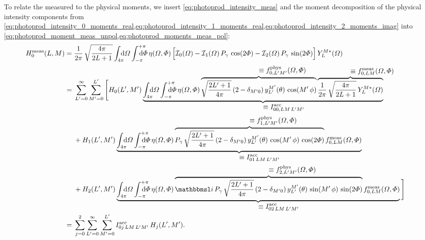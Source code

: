 To relate the measured to the physical moments, we insert
\cref{eq:photoprod_intensity_meas} and the moment decomposition of the
physical intensity components from
\cref{eq:photoprod_intensity_0_moments_real,eq:photoprod_intensity_1_moments_real,eq:photoprod_intensity_2_moments_imag}
into
\cref{eq:photoprod_moment_meas_unpol,eq:photoprod_moments_meas_pol}:
\begin{align}
  H_0^\text{meas}(L, M)
  ={}& \frac{1}{2 \pi}\, \sqrt{\frac{4 \pi}{2 L + 1}} \int_{4 \pi}\!\!\!\! \dif{\Omega} \int_{-\pi}^{+\pi}\hspace{-1.2em} \dif{\Phi}\,
  \eta(\Omega, \Phi) \sBrk[2]{\intensity_0(\Omega)
  - \intensity_1(\Omega)\, P_\gamma\, \cos(2 \Phi)
  - \intensity_2(\Omega)\, P_\gamma\, \sin(2 \Phi)}
  Y_L^{M *}(\Omega) \nonumber
  \\
  ={}& \sum_{L' = 0}^\infty \sum_{M' = 0}^{L'} \Bigg[
  H_0(L', M')\,
  \rdUnderbrace{\int_{4 \pi}\!\!\!\! \dif{\Omega} \int_{-\pi}^{+\pi}\hspace{-1.2em} \dif{\Phi}\,
  \eta(\Omega, \Phi)\,
  \rdOverbrace{\sqrt{\frac{2 L' + 1}{4 \pi}}\, (2 - \delta_{M' 0})\, y_{L'}^{M'}(\theta)\, \cos(M'\, \phi)\vphantom{\frac{Y_L^M}{\sqrt{L}}}}{\equiv f_{0, L' M'}^\text{phys}(\Omega, \Phi)}\,
  \rdOverbrace{\frac{1}{2 \pi}\, \sqrt{\frac{4 \pi}{2 L + 1}}\, Y_L^{M *}(\Omega)}{\equiv f_{0, L M}^\text{meas}(\Omega, \Phi)}}%
  {\equiv I^\text{acc}_{0 0, L M\, L' M'}} \nonumber
  \\
  & + H_1(L', M')\,
  \rdUnderbrace{\int_{4 \pi}\!\!\!\! \dif{\Omega} \int_{-\pi}^{+\pi}\hspace{-1.2em} \dif{\Phi}\,
  \eta(\Omega, \Phi)\,
  \rdOverbrace{P_\gamma\, \sqrt{\frac{2 L' + 1}{4 \pi}}\, (2 - \delta_{M' 0})\, y_{L'}^{M'}(\theta)\, \cos(M'\, \phi)\, \cos(2 \Phi)}{\equiv f_{1, L' M'}^\text{phys}(\Omega, \Phi)}\,
  f_{0, L M}^\text{meas}(\Omega, \Phi)}%
  {\equiv I^\text{acc}_{0 1\, L M\, L' M'}} \nonumber
  \\
  & + H_2(L', M')\,
  \rdUnderbrace{\int_{4 \pi}\!\!\!\! \dif{\Omega} \int_{-\pi}^{+\pi}\hspace{-1.2em} \dif{\Phi}\,
  \eta(\Omega, \Phi)\,
  \rdOverbrace{\imag\, P_\gamma\, \sqrt{\frac{2 L' + 1}{4 \pi}}\, (2 - \delta_{M' 0})\, y_{L'}^{M'}(\theta)\, \sin(M'\, \phi)\, \sin(2 \Phi)}{\equiv f_{2, L' M'}^\text{phys}(\Omega, \Phi)}\,
  f_{0, L M}^\text{meas}(\Omega, \Phi)}%
  {\equiv I^\text{acc}_{0 2\, L M\, L' M'}}\, \Bigg] \nonumber
  \\
  \label{eq:photoprod_moment_0_meas2}
  ={}& \sum_{j = 0}^2 \sum_{L' = 0}^\infty \sum_{M' = 0}^{L'}
  I^\text{acc}_{0 j\, L M\, L' M'}\, H_j(L', M').
\end{align}
